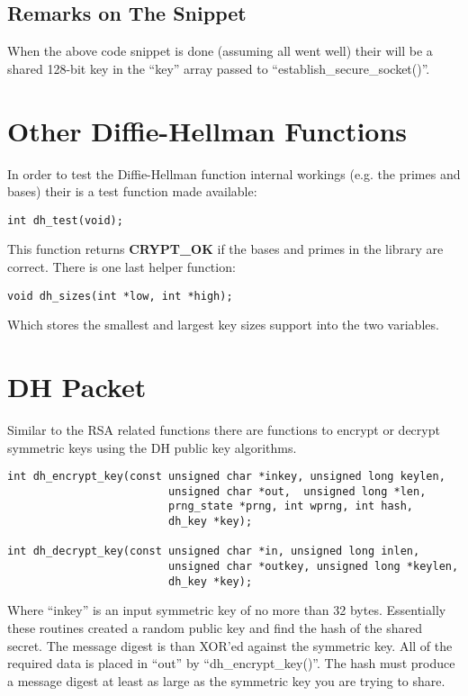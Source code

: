 \documentclass{book}
\begin{document}
\subsection{Remarks on The Snippet}
When the above code snippet is done (assuming all went well) their will be a shared 128-bit key in the ``key'' array
passed to ``establish\_secure\_socket()''.

\section{Other Diffie-Hellman Functions}
In order to test the Diffie-Hellman function internal workings (e.g. the primes and bases) their is a test function made
available:
\begin{verbatim}
int dh_test(void);
\end{verbatim}

This function returns {\bf CRYPT\_OK} if the bases and primes in the library are correct.  There is one last helper 
function:
\begin{verbatim}
void dh_sizes(int *low, int *high);
\end{verbatim}
Which stores the smallest and largest key sizes support into the two variables.

\section{DH Packet}
Similar to the RSA related functions there are functions to encrypt or decrypt symmetric keys using the DH public key
algorithms.  
\begin{verbatim}
int dh_encrypt_key(const unsigned char *inkey, unsigned long keylen,
                         unsigned char *out,  unsigned long *len, 
                         prng_state *prng, int wprng, int hash, 
                         dh_key *key);

int dh_decrypt_key(const unsigned char *in, unsigned long inlen,
                         unsigned char *outkey, unsigned long *keylen, 
                         dh_key *key);
\end{verbatim}
Where ``inkey'' is an input symmetric key of no more than 32 bytes.  Essentially these routines created a random public key
and find the hash of the shared secret.  The message digest is than XOR'ed against the symmetric key.  All of the 
required data is placed in ``out'' by ``dh\_encrypt\_key()''.   The hash must produce a message digest at least as large
as the symmetric key you are trying to share.
\end{document}
